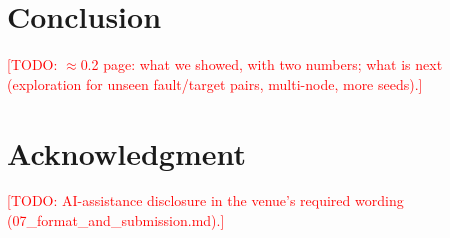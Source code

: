 \documentclass[conference,10pt]{IEEEtran}
\newcommand{\todo}[1]{\textcolor{red}{[TODO: #1]}}
\begin{document}
\section{Conclusion}\label{sec:conclusion}
\todo{$\approx$0.2 page: what we showed, with two numbers; what is next (exploration for unseen fault/target pairs, multi-node, more seeds).}

\section*{Acknowledgment}
\todo{AI-assistance disclosure in the venue's required wording (07\_format\_and\_submission.md).}

\nocite{*} %


\end{document}
